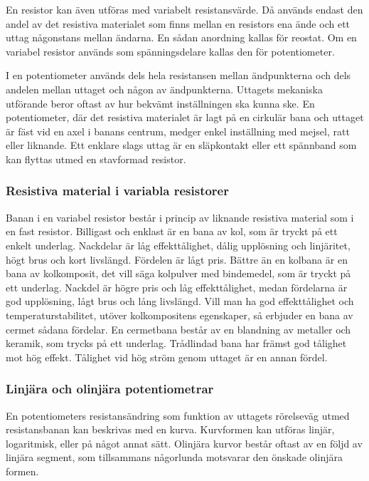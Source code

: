 En resistor kan även utföras med variabelt resistansvärde. Då används endast
den andel av det resistiva materialet som finns mellan en resistors ena ände
och ett uttag någonstans mellan ändarna. En sådan anordning kallas för reostat.
Om en variabel resistor används som spänningsdelare kallas den för
potentiometer.

I en potentiometer används dels hela resistansen mellan ändpunkterna och dels
andelen mellan uttaget och någon av ändpunkterna. Uttagets mekaniska utförande
beror oftast av hur bekvämt inställningen ska kunna ske. En potentiometer,
där det resistiva materialet är lagt på en cirkulär bana och uttaget är fäst
vid en axel i banans centrum, medger enkel inställning med mejsel, ratt eller liknande.
Ett enklare slags uttag är en släpkontakt eller ett spännband som kan flyttas
utmed en stavformad resistor.

\subsubsection{Resistiva material i variabla resistorer}

Banan i en variabel resistor består i princip av liknande resistiva material
som i en fast resistor. Billigast och enklast är en bana av kol, som är tryckt
på ett enkelt underlag. Nackdelar är låg effekttålighet, dålig upplösning och
linjäritet, högt brus och kort livslängd. Fördelen är lågt pris.
Bättre än en kolbana är en bana av kolkomposit, det vill säga kolpulver med 
bindemedel, som är tryckt på ett underlag. Nackdel är högre pris och låg 
effekttålighet, medan fördelarna är god upplösning, lågt brus och lång livslängd.
Vill man ha god effekttålighet och temperaturstabilitet, utöver kolkompositens
egenskaper, så erbjuder en bana av cermet sådana fördelar. En cermetbana består
av en blandning av metaller och keramik, som trycks på ett underlag.
Trådlindad bana har främst god tålighet mot hög effekt. Tålighet vid hög ström
genom uttaget är en annan fördel.

\subsubsection{Linjära och olinjära potentiometrar}

En potentiometers resistansändring som funktion av uttagets rörelseväg utmed 
resistansbanan kan beskrivas med en kurva. Kurvformen kan utföras linjär,
logaritmisk, eller på något annat sätt. Olinjära kurvor består oftast av en följd av 
linjära segment, som tillsammans någorlunda motsvarar den önskade olinjära 
formen.

